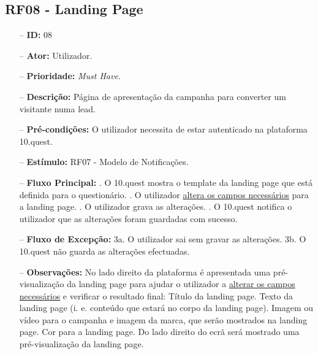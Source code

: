 \subsection{RF08 - Landing Page}
\begin{itemize}
	\item[--] \textbf{ID:} 08
	\item[--]  \textbf{Ator:} Utilizador.
	\item[--]  \textbf{Prioridade:} \textit{Must Have}.
	\item[--]  \textbf{Descrição:} Página de apresentação da campanha para converter um visitante numa lead.
	\item[--]  \textbf{Pré-condições:} O utilizador necessita de estar autenticado na plataforma 10.quest.
	\item[--]  \textbf{Estímulo:} RF07 - Modelo de Notificações.
	\item[--]  \textbf{Fluxo Principal:} 
		. O 10.quest mostra o template da landing page que está definida para o questionário.
		. O utilizador \underline{altera os campos necessários} para a landing page.
		. O utilizador grava as alterações.
		. O 10.quest notifica o utilizador que as alterações foram guardadas com sucesso.
	\item[--]  \textbf{Fluxo de Excepção:} 
		\subitem 3a. O utilizador sai sem gravar as alterações.
		\subitem 3b. O 10.quest não guarda as alterações efectuadas.
	\item[--]  \textbf{Observações:} No lado direito da plataforma é apresentada uma pré-visualização da landing page para ajudar o utilizador a \underline{alterar os campos necessários} e verificar o resultado final:
		\subitem Título da landing page.
		\subitem Texto da landing page (i. e. conteúdo que estará no corpo da landing page).
		\subitem Imagem ou vídeo para o campanha e imagem da marca, que serão mostrados na landing page.
		\subitem Cor para a landing page.
	Do lado direito do ecrã será mostrado uma pré-visualização da landing page.
\end{itemize}
\newpage

